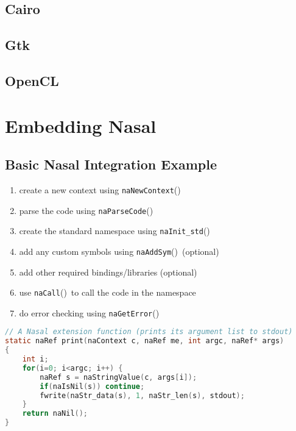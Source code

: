 \documentclass{article}
\newcommand{\todo}[1]{}
\newcommand{\func}[1]{\textcolor{func}{\tt #1}}
\newcommand{\nasalapi}[1]{\func{#1}}
\newcommand{\fp}{\textcolor{func}{()}}
\begin{document}
\subsection {Cairo}
\subsection {Gtk}
\subsection {OpenCL}


\section{Embedding Nasal}
\todo{Look at: nasal-bin.c, AlgoScore, FlightGear's FGNasalSys}
\subsection{Basic Nasal Integration Example}
\begin{enumerate}
  \item create a new context using \nasalapi{naNewContext}\fp
  \item parse the code using \nasalapi{naParseCode}\fp
  \item create the standard namespace using \nasalapi{naInit\_std}\fp
  \item add any custom symbols using \nasalapi{naAddSym}\fp\ (optional)
  \item add other required bindings/libraries (optional)
  \item use \nasalapi{naCall}\fp\ to call the code in the namespace
  \item do error checking using \nasalapi{naGetError}\fp
\end{enumerate}

\begin{lstlisting}[language=C]
// A Nasal extension function (prints its argument list to stdout)
static naRef print(naContext c, naRef me, int argc, naRef* args)
{
    int i;
    for(i=0; i<argc; i++) {
        naRef s = naStringValue(c, args[i]);
        if(naIsNil(s)) continue;
        fwrite(naStr_data(s), 1, naStr_len(s), stdout);
    }
    return naNil();
}
\end{lstlisting}
\end{document}
